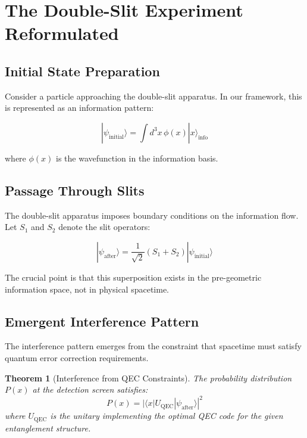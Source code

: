 \documentclass[12pt,a4paper]{article}
\newtheorem{theorem}{Theorem}[section]
\begin{document}
\section{The Double-Slit Experiment Reformulated}

\subsection{Initial State Preparation}

Consider a particle approaching the double-slit apparatus. In our framework, this is represented as an information pattern:

\begin{equation}
|\psi_{\text{initial}}\rangle = \int d^3x \, \phi(x) |x\rangle_{\text{info}}
\end{equation}

where $\phi(x)$ is the wavefunction in the information basis.

\subsection{Passage Through Slits}

The double-slit apparatus imposes boundary conditions on the information flow. Let $S_1$ and $S_2$ denote the slit operators:

\begin{equation}
|\psi_{\text{after}}\rangle = \frac{1}{\sqrt{2}}(S_1 + S_2)|\psi_{\text{initial}}\rangle
\end{equation}

The crucial point is that this superposition exists in the pre-geometric information space, not in physical spacetime.

\subsection{Emergent Interference Pattern}

The interference pattern emerges from the constraint that spacetime must satisfy quantum error correction requirements.

\begin{theorem}[Interference from QEC Constraints]
The probability distribution $P(x)$ at the detection screen satisfies:
\begin{equation}
P(x) = |\langle x|U_{\text{QEC}}|\psi_{\text{after}}\rangle|^2
\end{equation}
where $U_{\text{QEC}}$ is the unitary implementing the optimal QEC code for the given entanglement structure.
\end{theorem}
\end{document}
